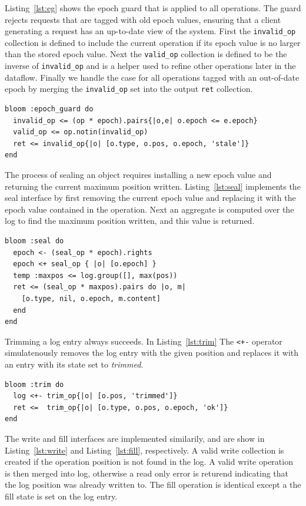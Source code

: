 \documentclass[10pt,twocolumn]{article}
\begin{document}
Listing~\ref{lst:eg} shows the epoch guard that is applied to all operations.
The guard rejects requests that are tagged with old epoch values, ensuring that
a client generating a request has an up-to-date view of the system.  First the
\texttt{invalid\_op} collection is defined to include the current operation if
its epoch value is no larger than the stored epoch value. Next the
\texttt{valid\_op} collection is defined to be the inverse of
\texttt{invalid\_op} and is a helper used to refine other operations later in
the dataflow. Finally we handle the case for all operations tagged with an
out-of-date epoch by merging the \texttt{invalid\_op} set into the output
\texttt{ret} collection.

\begin{lstlisting}[caption={Epoch Guard}, label=lst:eg]
bloom :epoch_guard do
  invalid_op <= (op * epoch).pairs{|o,e| o.epoch <= e.epoch}
  valid_op <= op.notin(invalid_op)
  ret <= invalid_op{|o| [o.type, o.pos, o.epoch, 'stale']}
end
\end{lstlisting}

The process of sealing an object requires installing a new epoch value and
returning the current maximum position written. Listing~\ref{lst:seal} 
implements the seal interface by first removing the current epoch value and
replacing it with the epoch value contained in the operation. Next an aggregate
is computed over the log to find the maximum position written, and this value
is returned.

\begin{lstlisting}[caption={Seal}, label=lst:seal]
bloom :seal do
  epoch <- (seal_op * epoch).rights
  epoch <+ seal_op { |o| [o.epoch] }
  temp :maxpos <= log.group([], max(pos))
  ret <= (seal_op * maxpos).pairs do |o, m|
    [o.type, nil, o.epoch, m.content]
  end
end
\end{lstlisting}

Trimming a log entry always succeeds. In Listing~\ref{lst:trim} The
\texttt{<+-} operator simulatenously removes the log entry with the given 
position and replaces it with an entry with its state set to \emph{trimmed}.

\begin{lstlisting}[caption={Trim}, label=lst:trim]
bloom :trim do
  log <+- trim_op{|o| [o.pos, 'trimmed']}
  ret <=  trim_op{|o| [o.type, o.pos, o.epoch, 'ok']}
end
\end{lstlisting}

The write and fill interfaces are implemented similarily, and are show in
Listing~\ref{lst:write} and Listing~\ref{lst:fill}, respectively.  A valid
write collection is created if the operation position is not found in the log.
A valid write operation is then merged into log, otherwise a read only error is
returend indicating that the log position was already written to.
The fill operation is identical except a the fill state is set on the log entry.
\end{document}
